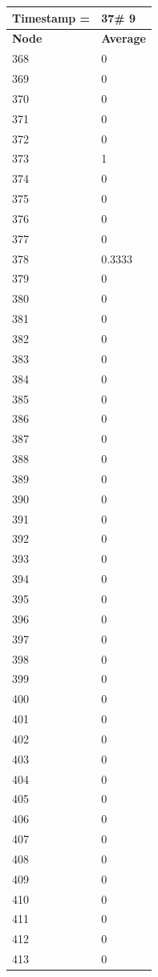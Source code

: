 \begin{tabular}{|l||l|}
\hline
\textbf{Timestamp =} & \textbf{37}\# 9\\\hline
	\textbf{Node} & \textbf{Average} \\ \hline
\hline
	368 & 0 \\ \hline
	369 & 0 \\ \hline
	370 & 0 \\ \hline
	371 & 0 \\ \hline
	372 & 0 \\ \hline
	373 & 1 \\ \hline
	374 & 0 \\ \hline
	375 & 0 \\ \hline
	376 & 0 \\ \hline
	377 & 0 \\ \hline
	378 & 0.3333 \\ \hline
	379 & 0 \\ \hline
	380 & 0 \\ \hline
	381 & 0 \\ \hline
	382 & 0 \\ \hline
	383 & 0 \\ \hline
	384 & 0 \\ \hline
	385 & 0 \\ \hline
	386 & 0 \\ \hline
	387 & 0 \\ \hline
	388 & 0 \\ \hline
	389 & 0 \\ \hline
	390 & 0 \\ \hline
	391 & 0 \\ \hline
	392 & 0 \\ \hline
	393 & 0 \\ \hline
	394 & 0 \\ \hline
	395 & 0 \\ \hline
	396 & 0 \\ \hline
	397 & 0 \\ \hline
	398 & 0 \\ \hline
	399 & 0 \\ \hline
	400 & 0 \\ \hline
	401 & 0 \\ \hline
	402 & 0 \\ \hline
	403 & 0 \\ \hline
	404 & 0 \\ \hline
	405 & 0 \\ \hline
	406 & 0 \\ \hline
	407 & 0 \\ \hline
	408 & 0 \\ \hline
	409 & 0 \\ \hline
	410 & 0 \\ \hline
	411 & 0 \\ \hline
	412 & 0 \\ \hline
	413 & 0 \\ \hline
\end{tabular}

